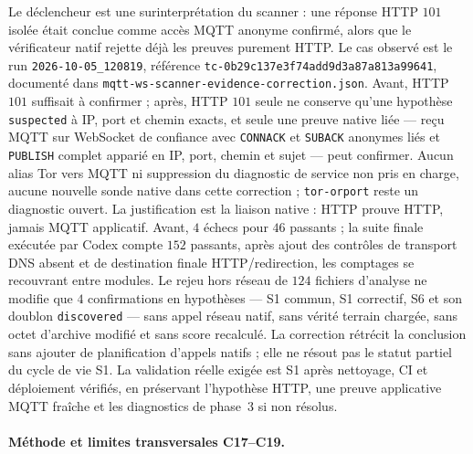 \documentclass[11pt,a4paper]{article}
\newcommand{\code}[1]{{\urlstyle{tt}\nolinkurl{#1}}}
\begin{document}
Le déclencheur est une surinterprétation du scanner : une réponse HTTP $101$ isolée était conclue comme accès MQTT anonyme confirmé, alors que le vérificateur natif rejette déjà les preuves purement HTTP. Le cas observé est le run \code{2026-10-05_120819}, référence \code{tc-0b29c137e3f74add9d3a87a813a99641}, documenté dans \code{mqtt-ws-scanner-evidence-correction.json}. Avant, HTTP $101$ suffisait à confirmer ; après, HTTP $101$ seule ne conserve qu'une hypothèse \code{suspected} à IP, port et chemin exacts, et seule une preuve native liée --- reçu MQTT sur WebSocket de confiance avec \code{CONNACK} et \code{SUBACK} anonymes liés et \code{PUBLISH} complet apparié en IP, port, chemin et sujet --- peut confirmer. Aucun alias Tor vers MQTT ni suppression du diagnostic de service non pris en charge, aucune nouvelle sonde native dans cette correction ; \code{tor-orport} reste un diagnostic ouvert. La justification est la liaison native : HTTP prouve HTTP, jamais MQTT applicatif. Avant, $4$ échecs pour $46$ passants ; la suite finale exécutée par Codex compte $152$ passants, après ajout des contrôles de transport DNS absent et de destination finale HTTP/redirection, les comptages se recouvrant entre modules. Le rejeu hors réseau de $124$ fichiers d'analyse ne modifie que $4$ confirmations en hypothèses --- S1 commun, S1 correctif, S6 et son doublon \code{discovered} --- sans appel réseau natif, sans vérité terrain chargée, sans octet d'archive modifié et sans score recalculé. La correction rétrécit la conclusion sans ajouter de planification d'appels natifs ; elle ne résout pas le statut partiel du cycle de vie S1. La validation réelle exigée est S1 après nettoyage, CI et déploiement vérifiés, en préservant l'hypothèse HTTP, une preuve applicative MQTT fraîche et les diagnostics de phase~3 si non résolus.

\paragraph{Méthode et limites transversales C17--C19.}
\end{document}
